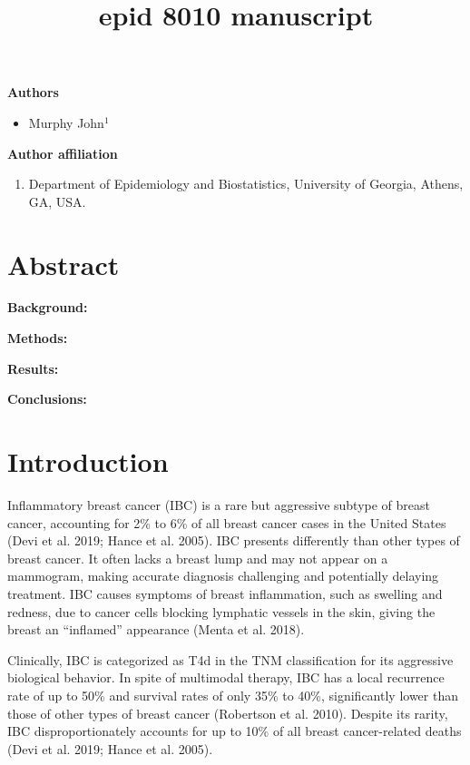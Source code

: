 \documentclass[
  letterpaper,
  DIV=11,
  numbers=noendperiod]{scrartcl}
\title{epid 8010 manuscript}
\author{}
\date{}
\providecommand{\tightlist}{%
  \setlength{\itemsep}{0pt}\setlength{\parskip}{0pt}}\usepackage{longtable,booktabs,array}
\begin{document}
\maketitle


\textbf{Authors}

\begin{itemize}
\tightlist
\item
  Murphy John\(^{1}\)
\end{itemize}

\textbf{Author affiliation}

\begin{enumerate}
\def\labelenumi{\arabic{enumi}.}
\tightlist
\item
  Department of Epidemiology and Biostatistics, University of Georgia,
  Athens, GA, USA.
\end{enumerate}

\pagebreak

\section{Abstract}\label{abstract}

\textbf{Background:}

\textbf{Methods:}

\textbf{Results:}

\textbf{Conclusions:}

\pagebreak

\section{Introduction}\label{introduction}

Inflammatory breast cancer (IBC) is a rare but aggressive subtype of
breast cancer, accounting for 2\% to 6\% of all breast cancer cases in
the United States (Devi et al. 2019; Hance et al. 2005). IBC presents
differently than other types of breast cancer. It often lacks a breast
lump and may not appear on a mammogram, making accurate diagnosis
challenging and potentially delaying treatment. IBC causes symptoms of
breast inflammation, such as swelling and redness, due to cancer cells
blocking lymphatic vessels in the skin, giving the breast an
``inflamed'' appearance (Menta et al. 2018).

Clinically, IBC is categorized as T4d in the TNM classification for its
aggressive biological behavior. In spite of multimodal therapy, IBC has
a local recurrence rate of up to 50\% and survival rates of only 35\% to
40\%, significantly lower than those of other types of breast cancer
(Robertson et al. 2010). Despite its rarity, IBC disproportionately
accounts for up to 10\% of all breast cancer-related deaths (Devi et al.
2019; Hance et al. 2005).
\end{document}
